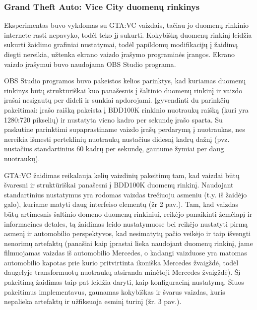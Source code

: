 \documentclass{VUMIFPSkursinis}
\begin{document}
        \subsubsection{Grand Theft Auto: Vice City duomenų rinkinys}
            Eksperimentas buvo vykdomas su GTA:VC vaizdais, tačiau jo duomenų rinkinio internete rasti nepavyko, todėl teko jį sukurti. Kokybišką duomenų rinkinį leidžia sukurti žaidimo grafiniai nustatymai, todėl papildomų modifikacijų į žaidimą diegti nereikia, užtenka ekrano vaizdo įrašymo programinės įrangos. Ekrano vaizdo įrašymui buvo naudojama OBS Studio programa.
            
            OBS Studio programos buvo pakeistos kelios parinktys, kad kuriamas duomenų rinkinys būtų struktūriškai kuo panašesnis į šaltinio duomenų rinkinį ir vaizdo įrašai nesigautų per dideli ir sunkiai apdorojami. Įgyvendinti du parinkčių pakeitimai: įrašo raišką pakeista į BDD100K rinkinio nuotraukų raišką (kuri yra 1280:720 pikselių) ir nustatyta vieno kadro per sekundę įrašo sparta. Su paskutine parinktimi supaprastiname vaizdo įrašų perdarymą į nuotraukas, nes nereikia išmesti perteklinių nuotraukų nustačius didesnį kadrų dažnį (pvz. nustačius standartinius 60 kadrų per sekundę, gautume žymiai per daug nuotraukų).
            
            GTA:VC žaidimas reikalauja kelių vaizdinių pakeitimų tam, kad vaizdai būtų švaresni ir struktūriškai panašesni į BDD100K duomenų rinkinį. Naudojant standartinius nustatymus yra rodomas vaizdas trečiuoju asmeniu (t.y. iš žaidėjo galo), kuriame matyti daug interfeiso elementų (žr 2 pav.). Tam, kad vaizdas būtų artimesnis šaltinio domeno duomenų rinkiniui, reikėjo panaikinti žemėlapį ir informacines detales, tą žaidimas leido nustatymuose bei reikėjo nustatyti pirmą asmenį ir automobilio perspektyvos, kad nesimatytų pačio veikėjo ir taip išvengti nenorimų artefaktų (panašiai kaip įprastai lieka naudojant \cite{DaimCityDaSe} duomenų rinkinį, jame filmuojamas vaizdas iš automobilio Mercedes, o kadangi vaizduose yra matomas automobilio kapotas prie kurio pritvirtinta ikoniška Mercedes žvaigždė, todėl daugelyje transformuotų nuotraukų atsiranda minėtoji Mercedes žvaigždė). Šį pakeitimą žaidimas taip pat leidžia daryti, kaip konfiguracinį nustatymą. Šiuos pakeitimus implementavus, gaunamas kokybiškas ir švarus vaizdas, kuris nepalieka artefaktų ir užfiksuoja esminį turinį (žr. 3 pav.).
\end{document}
